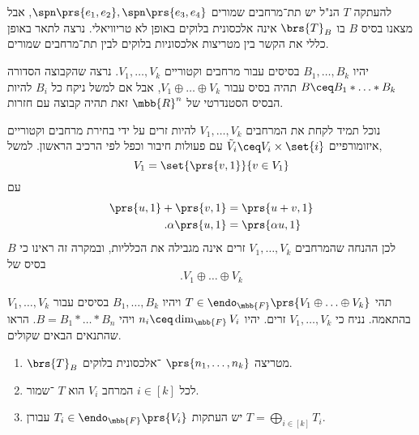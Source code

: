 \documentclass[a4paper,10pt,oneside,openany]{article}
\begin{document}
להעתקה
$T$
הנ"ל יש תת־מרחבים שמורים
$\spn\prs{e_1, e_2}, \spn\prs{e_3, e_4}$,
אבל מצאנו בסיס
$B$
בו
$\brs{T}_B$
אינה אלכסונית בלוקים באופן לא טריוויאלי.
נרצה לתאר באופן כללי את הקשר בין מטריצות אלכסוניות בלוקים לבין תת־מרחבים שמורים.

\begin{remark}
יהיו
$B_1, \ldots, B_k$
בסיסים עבור מרחבים וקטוריים
$V_1, \ldots, V_k$.
נרצה שהקבוצה הסדורה
$B \ceq B_1 * \ldots * B_k$
תהיה בסיס עבור
$V_1 \oplus \ldots \oplus V_k$,
אבל אם למשל ניקח כל
$B_i$
להיות הבסיס הסטנדרטי של
$\mbb{R}^n$
זאת תהיה קבוצה עם חזרות.

נוכל תמיד לקחת את המרחבים
$V_1, \ldots, V_k$
להיות זרים על ידי בחירת מרחבים וקטוריים איזומורפיים
$\tilde{V}_i \ceq V_i \times \set{i}$
עם פעולות חיבור וכפל לפי הרכיב הראשון.
למשל,
\[V_1 = \set{\prs{v,1}}{v \in V_1}\]
עם
\begin{align*}
\prs{u,1} + \prs{v,1} &= \prs{u+v,1} \\
\text{.} \alpha \prs{u,1} &= \prs{\alpha u,1}
\end{align*}
לכן ההנחה שהמרחבים
$V_1, \ldots, V_k$
זרים אינה מגבילה את הכלליות, ובמקרה זה ראינו כי
$B$
בסיס של
\[\text{.} V_1 \oplus \ldots \oplus V_k\]
\end{remark}

\begin{exercise}
תהי
$T \in \endo_{\mbb{F}}\prs{V_1 \oplus \ldots \oplus V_k}$
ויהיו
$B_1, \ldots, B_k$
בסיסים עבור
$V_1, \ldots, V_k$
בהתאמה.
נניח כי
$V_1, \ldots, V_k$
זרים.
יהיו
$n_i \ceq \dim_{\mbb{F}} V_i$
ויהי
$B = B_1 * \ldots * B_n$.
הראו שהתנאים הבאים שקולים.
\begin{enumerate}
\item $\brs{T}_B$
מטריצה
$\prs{n_1, \ldots, n_k}$%
־אלכסונית בלוקים.

\item לכל
$i \in [k]$
המרחב
$V_i$
הוא
$T$%
־שמור.

\item יש העתקות
$T_i \in \endo_{\mbb{F}}\prs{V_i}$
עבורן
$T = \bigoplus_{i \in [k]} T_i$.
\end{enumerate}
\end{exercise}
\end{document}
